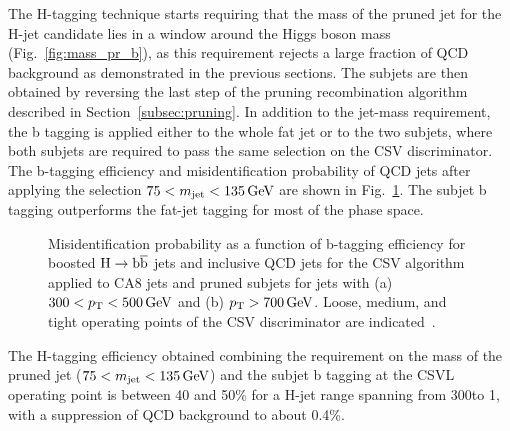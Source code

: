 The H-tagging technique starts requiring that the mass of the pruned jet for the H-jet candidate lies in a window around the Higgs boson mass (Fig.~\ref{fig:mass_pr_b}),
as this requirement rejects a large fraction of QCD background as demonstrated in the previous sections.
The subjets are then obtained by reversing the last step of the pruning recombination algorithm described in Section~\ref{subsec:pruning}.
In addition to the jet-mass requirement, the b tagging is applied either to the whole fat jet or to the two subjets, where both subjets are required
to pass the same selection on the CSV discriminator. The b-tagging efficiency and misidentification probability of QCD jets after applying the selection $75 < m_{\text{jet}} < 135\,\text{Ge\hspace{-.08em}V}$ are shown in Fig.~\ref{fig:htagging8TeV}.
The subjet b tagging outperforms the fat-jet tagging for most of the phase space.

\begin{figure}[!htb]
\centering     %
{}
 \caption{Misidentification probability as a function of b-tagging efficiency for boosted $\mathrm{H}\to{\mathrm{b}\overline{\mathrm{b}}}$ jets and inclusive QCD jets for the CSV algorithm applied to CA8 jets
 and pruned subjets for jets with (a) $300 < p_{\mathrm{T}} < 500\,\text{Ge\hspace{-.08em}V}$ and (b) $p_{\mathrm{T}} > 700\,\text{Ge\hspace{-.08em}V}$. Loose, medium, and tight operating points of the CSV discriminator are indicated~\cite{CMS:BTV13001}.}
\label{fig:htagging8TeV}
\end{figure}

The H-tagging efficiency obtained combining the requirement on the mass of the pruned jet ($75 < m_{\text{jet}} < 135\,\text{Ge\hspace{-.08em}V}$)
and the subjet b tagging at the CSVL operating point is between 40 and 50\% for a H-jet \pt range spanning from 300\GeV to 1\TeV,
with a suppression of QCD background to about 0.4\%.\\

